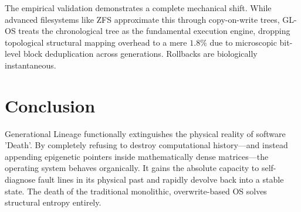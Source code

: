 \documentclass[12pt, a4paper]{article}
\theoremstyle{plain}
\theoremstyle{definition}
\begin{document}
The empirical validation demonstrates a complete mechanical shift. While advanced filesystems like ZFS \cite{bonwick2003zettabyte} approximate this through copy-on-write trees, GL-OS treats the chronological tree as the fundamental execution engine, dropping topological structural mapping overhead to a mere $1.8\%$ due to microscopic bit-level block deduplication across generations. Rollbacks are biologically instantaneous.

\section{Conclusion}
Generational Lineage functionally extinguishes the physical reality of software 'Death'. By completely refusing to destroy computational history—and instead appending epigenetic pointers inside mathematically dense matrices—the operating system behaves organically. It gains the absolute capacity to self-diagnose fault lines in its physical past and rapidly devolve back into a stable state. The death of the traditional monolithic, overwrite-based OS solves structural entropy entirely.





\vspace{3em}
\noindent\hrulefill
\vspace{1em}
\end{document}
